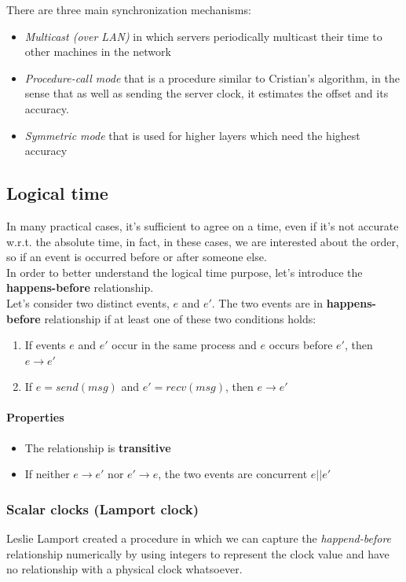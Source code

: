 There are three main synchronization mechanisms:
\begin{itemize}
    \item \textit{Multicast (over LAN)} in which servers periodically multicast their time to other machines in the network
    \item \textit{Procedure-call mode} that is a procedure similar to Cristian's algorithm, in the sense that as well as sending the server clock, it estimates the offset and its accuracy.
    \item \textit{Symmetric mode} that is used for higher layers which need the highest accuracy
\end{itemize}

\subsection{Logical time}
In many practical cases, it's sufficient to agree on a time, even if it's not accurate w.r.t. the absolute time, in fact, in these cases, we are interested about the order, so if an event is occurred before or after someone else.\\
In order to better understand the logical time purpose, let's introduce the \textbf{happens-before} relationship.\\
Let's consider two distinct events, $e$ and $e'$. The two events are in \textbf{happens-before} relationship if at least one of these two conditions holds:
\begin{enumerate}
    \item If events $e$ and $e'$ occur in the same process and $e$ occurs before $e'$, then $e \rightarrow e'$
    \item If $e = send(msg)$ and $e' = recv(msg)$, then $e \rightarrow e'$
\end{enumerate}

\paragraph{Properties}
\begin{itemize}
    \item The relationship is \textbf{transitive}
    \item If neither $e \rightarrow e'$ nor $e' \rightarrow e$, the two events are concurrent $e || e'$
\end{itemize}

\subsubsection{Scalar clocks (Lamport clock)}
Leslie Lamport created a procedure in which we can capture the \textit{happend-before} relationship numerically by using integers to represent the clock value and have no relationship with a physical clock whatsoever.

